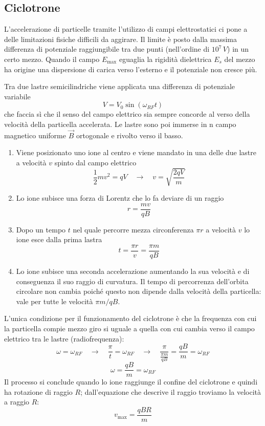 \documentclass[x11names]{report}
\begin{document}
\subsection{Ciclotrone}
L'accelerazione di particelle tramite l'utilizzo di campi elettrostatici ci pone a delle limitazioni fisiche difficili da aggirare. Il limite è posto dalla massima differenza di potenziale raggiungibile tra due punti (nell'ordine di \(10^7 \, V\)) in un certo mezzo. Quando il campo \(E_\text{max}\) eguaglia la rigidità dielettrica \(E_s\) del mezzo ha origine una dispersione di carica verso l'esterno e il potenziale non cresce più.

Tra due lastre semicilindriche viene applicata una differenza di potenziale variabile
\[
V = V_0\sin(\omega_{RF} t)
\]
che faccia sì che il senso del campo elettrico sia sempre concorde al verso della velocità della particella accelerata. Le lastre sono poi immerse in n campo magnetico uniforme \(\vec{B}\) ortogonale e rivolto verso il basso.

\begin{enumerate}
	\item Viene posizionato uno ione al centro e viene mandato in una delle due lastre a velocità \(v\) spinto dal campo elettrico
	\[
	\frac{1}{2}mv^2 = qV \quad \to\quad v = \sqrt{\frac{2qV}{m}}
	\]
	\item Lo ione subisce una forza di Lorentz che lo fa deviare di un raggio
	\[
	r = \frac{mv}{qB}
	\]
	\item Dopo un tempo \(t\) nel quale percorre mezza circonferenza \(\pi r\) a velocità \(v\) lo ione esce dalla prima lastra
	\[
	t = \frac{\pi r}{v} = \frac{\pi m}{qB}
	\]
	\item Lo ione subisce una seconda accelerazione aumentando la sua velocità e di conseguenza il suo raggio di curvatura. Il tempo di percorrenza dell'orbita circolare non cambia poiché questo non dipende dalla velocità della particella: vale per tutte le velocità \(\pi m/qB\).
\end{enumerate}

L'unica condizione per il funzionamento del ciclotrone è che la frequenza con cui  la particella compie mezzo giro si uguale a quella con cui cambia verso il campo elettrico tra le lastre (radiofrequenza):
\[
\omega = \omega_{RF} \quad \to \quad \frac{\pi}{t} =  \omega_{RF}\quad \to \quad \frac{\pi}{\frac{\pi m}{qB}} = \frac{qB}{m} = \omega_{RF}
\]
\begin{equation}
	\omega = \frac{qB}{m} = \omega_{RF}
\end{equation}
Il processo si conclude quando lo ione raggiunge il confine del ciclotrone e quindi ha rotazione di raggio \(R\); dall'equazione che descrive il raggio troviamo la velocità a raggio \(R\):
\[
v_\text{max} = \frac{qBR}{m}
\]
\end{document}
